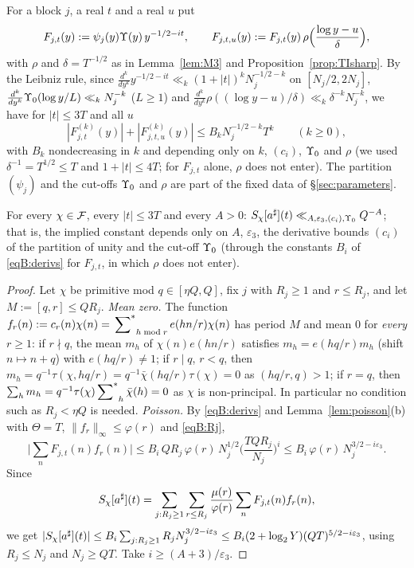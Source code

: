 For a block $j$, a real $t$ and a real $u$ put
\begin{equation}\label{eqB:Fjt}
 F_{j,t}(y):=\psi_j(y)\Upsilon(y)\,y^{-1/2-it},\qquad F_{j,t,u}(y):=F_{j,t}(y)\,\rho\Big(\frac{\log y-u}\delta\Big),
\end{equation}
with $\rho$ and $\delta=T^{-1/2}$ as in Lemma~\ref{lem:M3} and Proposition~\ref{prop:TIsharp}. By the Leibniz rule, since
$\frac{d^k}{dy^k}y^{-1/2-it}\ll_k(1+|t|)^kN_j^{-1/2-k}$ on $[N_j/2,2N_j]$, $\frac{d^k}{dy^k}\Upsilon_0(\log y/L)\ll_kN_j^{-k}$ ($L\ge1$) and
$\frac{d^k}{dy^k}\rho((\log y-u)/\delta)\ll_k\delta^{-k}N_j^{-k}$, we have for $|t|\le3T$ and all $u$
\begin{equation}\label{eqB:derivs}
 |F_{j,t}^{(k)}(y)|+|F_{j,t,u}^{(k)}(y)|\le B_kN_j^{-1/2-k}T^k\qquad(k\ge0),
\end{equation}
with $B_k$ nondecreasing in $k$ and depending only on $k$, $(c_i)$, $\Upsilon_0$ and $\rho$ (we used $\delta^{-1}=T^{1/2}\le T$ and $1+|t|\le4T$;
for $F_{j,t}$ alone, $\rho$ does not enter). The partition $(\psi_j)$ and the cut-offs $\Upsilon_0$ and $\rho$ are part of the fixed data of
\S\ref{sec:parameters}.

\begin{lemma}[B1: invisibility]\label{lem:B1}
For every $\chi\in\mathcal{F}$, every $|t|\le3T$ and every $A>0$: $S_\chi[a^\sharp](t)\ll_{A,\varepsilon_3,(c_i),\Upsilon_0}Q^{-A}$; that is, the
implied constant depends only on $A$, $\varepsilon_3$, the derivative bounds $(c_i)$ of the partition of unity and the cut-off $\Upsilon_0$
(through the constants $B_i$ of \eqref{eqB:derivs} for $F_{j,t}$, in which $\rho$ does not enter).
\end{lemma}

\begin{proof}
Let $\chi$ be primitive mod $q\in[\eta Q,Q]$, fix $j$ with $R_j\ge1$ and $r\le R_j$, and let $M:=[q,r]\le QR_j$.
\emph{Mean zero.} The function $f_r(n):=c_r(n)\chi(n)=\sideset{}{^*}\sum_{h\bmod r}e(hn/r)\chi(n)$ has period $M$ and mean $0$ for
\emph{every} $r\ge1$: if $r\nmid q$, the mean $m_h$ of $\chi(n)e(hn/r)$ satisfies $m_h=e(hq/r)m_h$ (shift $n\mapsto n+q$) with
$e(hq/r)\ne1$; if $r\mid q$, $r<q$, then $m_h=q^{-1}\tau(\chi,hq/r)=q^{-1}\bar\chi(hq/r)\tau(\chi)=0$ as $(hq/r,q)>1$; if $r=q$, then
$\sum_hm_h=q^{-1}\tau(\chi)\sideset{}{^*}\sum_h\bar\chi(h)=0$ as $\chi$ is non-principal. In particular no condition such as $R_j<\eta Q$ is
needed.
\emph{Poisson.} By \eqref{eqB:derivs} and Lemma~\ref{lem:poisson}(b) with $\Theta=T$, $\|f_r\|_\infty\le\varphi(r)$ and \eqref{eqB:Rj},
\[
 \Big|\sum_nF_{j,t}(n)f_r(n)\Big|\le B_i\,QR_j\,\varphi(r)\,N_j^{1/2}\Big(\frac{TQR_j}{N_j}\Big)^i\le B_i\,\varphi(r)\,N_j^{3/2-i\varepsilon_3}.
\]
Since
\[
 S_\chi[a^\sharp](t)=\sum_{j:R_j\ge1}\sum_{r\le R_j}\frac{\mu(r)}{\varphi(r)}\sum_nF_{j,t}(n)f_r(n),
\]
we get
$|S_\chi[a^\sharp](t)|\le B_i\sum_{j:R_j\ge1}R_jN_j^{3/2-i\varepsilon_3}\le B_i(2+\log_2Y)(QT)^{5/2-i\varepsilon_3}$, using $R_j\le N_j$ and
$N_j\ge QT$. Take $i\ge(A+3)/\varepsilon_3$.
\end{proof}

